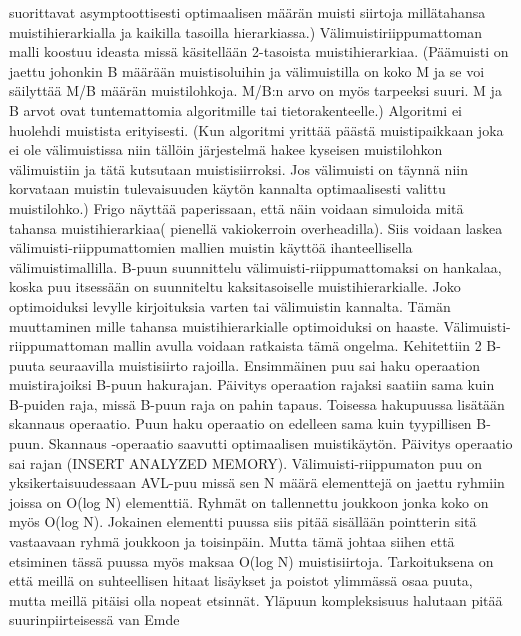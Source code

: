 \documentclass[finnish]{tktltiki2}
\theoremstyle{definition}
\theoremstyle{remark}
\begin{document}
suorittavat asymptoottisesti optimaalisen määrän muisti siirtoja millätahansa
muistihierarkialla ja kaikilla tasoilla hierarkiassa.) Välimuistiriippumattoman
malli koostuu ideasta missä käsitellään 2-tasoista muistihierarkiaa. (Päämuisti
on jaettu johonkin B määrään muistisoluihin ja välimuistilla on koko M ja se
voi säilyttää M/B määrän muistilohkoja. M/B:n arvo on myös tarpeeksi suuri.
M ja B arvot ovat tuntemattomia algoritmille tai tietorakenteelle.) Algoritmi
ei huolehdi muistista erityisesti. (Kun algoritmi yrittää päästä muistipaikkaan
joka ei ole välimuistissa niin tällöin järjestelmä hakee kyseisen muistilohkon
välimuistiin ja tätä kutsutaan muistisiirroksi. Jos välimuisti on täynnä niin
korvataan muistin tulevaisuuden käytön kannalta optimaalisesti valittu
muistilohko.) Frigo näyttää paperissaan, että näin voidaan simuloida mitä
tahansa muistihierarkiaa( pienellä vakiokerroin overheadilla). Siis voidaan
laskea välimuisti-riippumattomien mallien muistin käyttöä ihanteellisella
välimuistimallilla.
\newline \indent B-puun suunnittelu välimuisti-riippumattomaksi on hankalaa, koska puu
itsessään on suunniteltu kaksitasoiselle muistihierarkialle. Joko optimoiduksi
levylle kirjoituksia varten tai välimuistin kannalta. Tämän muuttaminen mille
tahansa muistihierarkialle optimoiduksi on haaste.
\newline \indent Välimuisti-riippumattoman mallin avulla voidaan ratkaista tämä ongelma.
Kehitettiin 2 B-puuta seuraavilla muistisiirto rajoilla. Ensimmäinen puu sai
haku operaation muistirajoiksi B-puun hakurajan. Päivitys operaation rajaksi
saatiin sama kuin B-puiden raja, missä B-puun raja on pahin tapaus. Toisessa
hakupuussa lisätään skannaus operaatio. Puun haku operaatio on edelleen sama
kuin tyypillisen B-puun. Skannaus -operaatio saavutti optimaalisen
muistikäytön. Päivitys operaatio sai rajan (INSERT ANALYZED MEMORY).
\newline \indent Välimuisti-riippumaton puu on yksikertaisuudessaan AVL-puu missä sen
N määrä elementtejä on jaettu ryhmiin joissa on O(log N) elementtiä. Ryhmät on
tallennettu joukkoon jonka koko on myös O(log N). Jokainen elementti puussa
siis pitää sisällään pointterin sitä vastaavaan ryhmä joukkoon ja toisinpäin.
Mutta tämä johtaa siihen että etsiminen tässä puussa myös maksaa O(log N)
muistisiirtoja. Tarkoituksena on että meillä on suhteellisen hitaat lisäykset
ja poistot ylimmässä osaa puuta, mutta meillä pitäisi olla nopeat etsinnät.
\newline \indent Yläpuun kompleksisuus halutaan pitää suurinpiirteisessä van Emde
\end{document}
